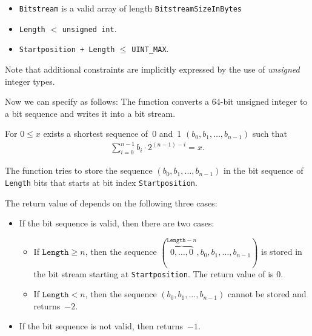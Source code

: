 \begin{itemize}
\item \texttt{Bitstream} is a valid array of length \verb"BitstreamSizeInBytes"

\item \texttt{Length} $<$ \texttt{unsigned int}.

\item \texttt{Startposition + Length} $\leq$ \verb"UINT_MAX".
\end{itemize}

Note that additional constraints are implicitly expressed by the use
of \emph{unsigned} integer types.


Now we can specify \poke as follows:
The function \poke converts a 64-bit unsigned integer to a bit sequence and 
writes it into a bit stream.

For $0 \leq x$ exists a shortest sequence of~0 and~1
$(b_0, b_1,\ldots,b_{n - 1})$
such that
\begin{align}
    \sum_{i=0}^{n-1} b_i \cdot 2^{(n - 1) - i} = x.
\end{align}

The function \poke tries to store the sequence $(b_0, b_1,\ldots,b_{n - 1})$
in the bit sequence of \texttt{Length} bits that starts
at bit index \texttt{Startposition}.

The return value of \poke depends on the following three cases:

\begin{itemize}
\item 
If the bit sequence is valid, then there are two cases:

\begin{itemize}
\item
If $\texttt{Length} \geq n$, then  the sequence
$(\overbrace{0,\ldots,0}^{\texttt{Length}-n},b_0, b_1,\ldots,b_{n - 1})$
is stored in the bit stream starting at \texttt{Startposition}.
The return value of \poke is 0.

\item
If $\texttt{Length} < n$, then the
sequence $(b_0, b_1,\ldots,b_{n - 1})$ cannot be stored and\\
\poke returns~$-2$.
\end{itemize}

\item 
If the bit sequence is not valid, then \poke returns~$-1$.
\end{itemize}

